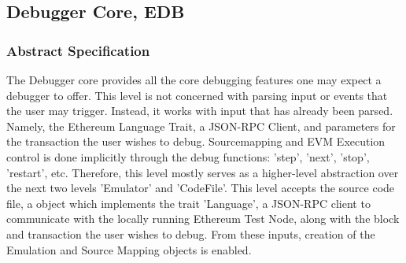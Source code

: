 \documentclass{report}
\begin{document}
\subsection{Debugger Core, EDB}


    \subsubsection{Abstract Specification}
        The Debugger core provides all the core debugging features one may expect a debugger to offer. This level is not concerned with parsing input or events that the user may trigger. Instead, it works with input that has already been parsed. Namely, the Ethereum Language Trait, a JSON-RPC Client, and parameters for the transaction the user wishes to debug. Sourcemapping and EVM Execution control is done implicitly through the debug functions: 'step', 'next', 'stop', 'restart', etc. Therefore, this level mostly serves as a higher-level abstraction over the next two levels 'Emulator' and 'CodeFile'. This level accepts the source code file, a object which implements the trait 'Language', a JSON-RPC client to communicate with the locally running Ethereum Test Node, along with the block and transaction the user wishes to debug. From these inputs, creation of the Emulation and Source Mapping objects is enabled.
\end{document}
